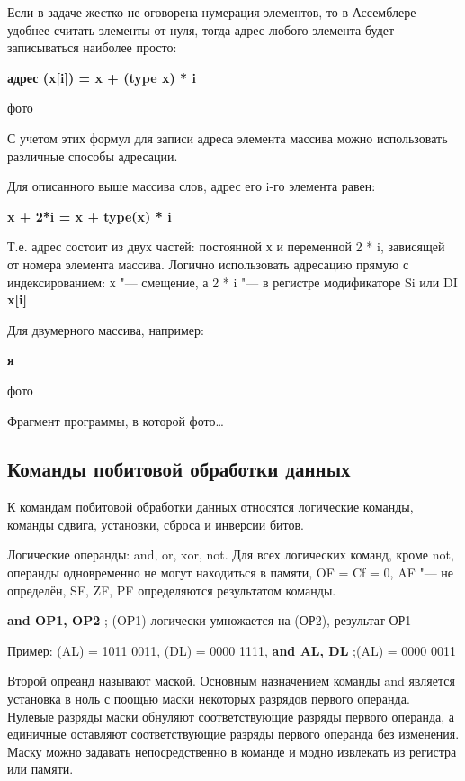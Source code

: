 Если в задаче жестко не оговорена нумерация элементов, то в Ассемблере удобнее считать элементы от нуля, тогда адрес любого элемента будет записываться наиболее просто:
\begin{center}
    \textbf{адрес (x[i]) = x + (type x) * i }
\end{center}
фото

С учетом этих формул для записи адреса элемента массива можно использовать различные способы адресации.

Для описанного выше массива слов, адрес его i-го элемента равен:
\begin{center}
    \textbf{x + 2*i = x + type(x) * i}
\end{center}
Т.е. адрес состоит из двух частей: постоянной х и переменной 2 * i, зависящей от номера элемента массива. Логично использовать адресацию прямую с индексированием: х "--- смещение, а 2 * i "--- в регистре модификаторе Si или DI     \textbf{x[i]}

Для двумерного массива, например:
\begin{center}
    \textbf{я}
\end{center}
фото

Фрагмент программы, в которой
фото\dots



\subsection{Команды побитовой обработки данных}
К командам побитовой обработки данных относятся логические команды, команды сдвига, установки, сброса и инверсии битов.

Логические операнды: and, or, xor, not. Для всех логических команд, кроме not, операнды одновременно не могут находиться в памяти, OF = Cf = 0, AF "--- не определён, SF, ZF, PF определяются результатом команды.

\textbf{and OP1, OP2} ; (OP1) логически умножается на (ОР2), результат ОР1

Пример: (AL) = 1011 0011, (DL) = 0000 1111,
\textbf{and AL, DL} ;(AL) = 0000 0011

Второй опреанд называют маской. Основным назначением команды and является установка в ноль с поощью маски некоторых разрядов первого операнда. Нулевые разряды маски обнуляют соответствующие разряды первого операнда, а единичные оставляют соответствующие разряды первого операнда без изменения. Маску можно задавать непосредственно в команде и модно извлекать из регистра или памяти.

